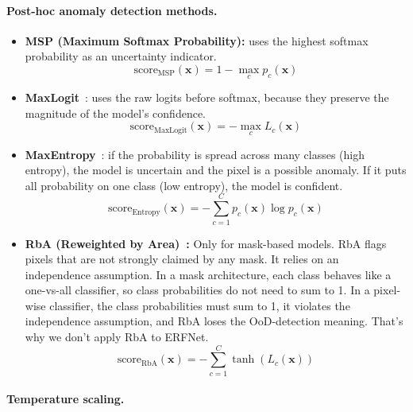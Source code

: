 \paragraph{Post-hoc anomaly detection methods.}
\begin{itemize}
    \item \textbf{MSP (Maximum Softmax Probability):} uses the highest softmax probability as an uncertainty indicator.
    \begin{equation}
    \text{score}_{\text{MSP}}(\mathbf{x}) = 1 - \max_c p_c(\mathbf{x})
    \end{equation}
    
    \item \textbf{MaxLogit}~\cite{maxlogit}: uses the raw logits before softmax, because they preserve the magnitude of the model's confidence.
    \begin{equation}
    \text{score}_{\text{MaxLogit}}(\mathbf{x}) = -\max_c L_c(\mathbf{x})
    \end{equation}
    
    \item \textbf{MaxEntropy}~\cite{maxentropy}: if the probability is spread across many classes (high entropy), the model is uncertain and the pixel is a possible anomaly. If it puts all probability on one class (low entropy), the model is confident.
    \begin{equation}
    \text{score}_{\text{Entropy}}(\mathbf{x}) = -\sum_{c=1}^{C} p_c(\mathbf{x}) \log p_c(\mathbf{x})
    \end{equation}
    
    \item \textbf{RbA (Reweighted by Area)~\cite{rba}:} Only for mask-based models. RbA flags pixels that are not strongly claimed by any mask. 
    It relies on an independence assumption. In a mask architecture, 
    each class behaves like a one-vs-all classifier, so class probabilities do not need to sum to 1.
    In a pixel-wise classifier, the class probabilities must sum to 1, it violates the independence assumption, and RbA loses the OoD-detection meaning.
    That's why we don't apply RbA to ERFNet.
    \begin{equation}
    \text{score}_{\text{RbA}}(\mathbf{x}) = -\sum_{c=1}^{C} \tanh(L_c(\mathbf{x}))
    \end{equation}
\end{itemize}


\paragraph{Temperature scaling.}

